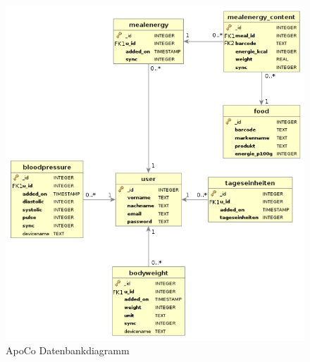\begin{figure}[h]
  \centering
  \includegraphics[scale=0.53]{diagramme/kapitel4/apoco_datenbank_schema.png}
  \caption{ApoCo Datenbankdiagramm}
  
\end{figure}

